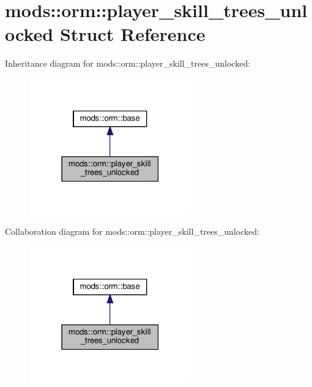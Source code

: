 \hypertarget{structmods_1_1orm_1_1player__skill__trees__unlocked}{}\section{mods\+:\+:orm\+:\+:player\+\_\+skill\+\_\+trees\+\_\+unlocked Struct Reference}
\label{structmods_1_1orm_1_1player__skill__trees__unlocked}


Inheritance diagram for mods\+:\+:orm\+:\+:player\+\_\+skill\+\_\+trees\+\_\+unlocked\+:
\nopagebreak
\begin{figure}[H]
\begin{center}
\leavevmode
\includegraphics[width=198pt]{structmods_1_1orm_1_1player__skill__trees__unlocked__inherit__graph}
\end{center}
\end{figure}


Collaboration diagram for mods\+:\+:orm\+:\+:player\+\_\+skill\+\_\+trees\+\_\+unlocked\+:
\nopagebreak
\begin{figure}[H]
\begin{center}
\leavevmode
\includegraphics[width=198pt]{structmods_1_1orm_1_1player__skill__trees__unlocked__coll__graph}
\end{center}
\end{figure}
